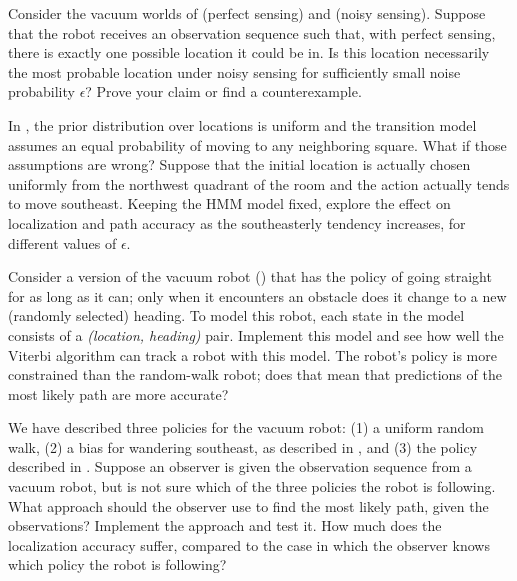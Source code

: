 \begin{uexercise}
Consider the vacuum worlds of  (perfect sensing)
and  (noisy sensing). Suppose that the robot receives an observation sequence such that, with perfect sensing, there is exactly one possible location it could be in.
Is this location necessarily the most probable location under noisy sensing for sufficiently small noise probability \(\epsilon\)? Prove your claim or find a counterexample.
\end{uexercise} 

\begin{exercise}
\prgex
In , the prior distribution over locations is uniform and the transition model assumes
an equal probability of moving to any neighboring square. What if those
assumptions are wrong?  Suppose that the initial location is actually chosen uniformly from
the northwest quadrant of the room and the  action
actually tends to move southeast\label{hmm-robot-southeast-page}.
Keeping the HMM model fixed, explore the effect on localization and path accuracy
as the southeasterly tendency increases, for different values of \(\epsilon\).
\end{exercise} 

\begin{exercise}
Consider a version of the vacuum robot () that has the policy of going straight for as long
as it can; only when it encounters an obstacle does it change to a new
(randomly selected) heading.  To model this robot, each state in the
model consists of a {\em (location, heading)} pair.  Implement this
model and see how well the Viterbi algorithm can track a robot with this
model.  The robot's policy is more constrained than the random-walk robot;
does that mean that predictions of the most likely path are more accurate?
\end{exercise} 

\begin{iexercise}\prgex%
We have described three policies for the vacuum robot: (1) a uniform random
walk, (2) a bias for wandering southeast, as described in ,
and (3) the policy described in .
Suppose an observer is given the observation sequence from a vacuum
robot, but is not sure which of the three policies the robot is
following.  What approach should the observer use to find the most
likely path, given the observations?  Implement the approach and test
it.  How much does the localization accuracy suffer, compared to the case in which the
observer knows which policy the robot is following?
\end{iexercise} 

